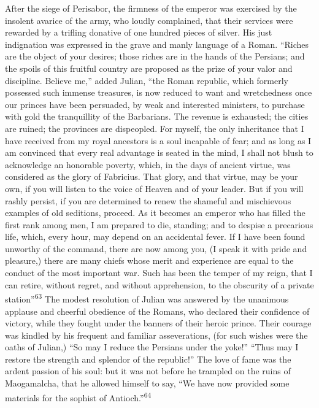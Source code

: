 After the siege of Perisabor, the firmness of the emperor was
exercised by the insolent avarice of the army, who loudly
complained, that their services were rewarded by a trifling
donative of one hundred pieces of silver. His just indignation
was expressed in the grave and manly language of a Roman. “Riches
are the object of your desires; those riches are in the hands of
the Persians; and the spoils of this fruitful country are
proposed as the prize of your valor and discipline. Believe me,”
added Julian, “the Roman republic, which formerly possessed such
immense treasures, is now reduced to want and wretchedness once
our princes have been persuaded, by weak and interested
ministers, to purchase with gold the tranquillity of the
Barbarians. The revenue is exhausted; the cities are ruined; the
provinces are dispeopled. For myself, the only inheritance that I
have received from my royal ancestors is a soul incapable of
fear; and as long as I am convinced that every real advantage is
seated in the mind, I shall not blush to acknowledge an honorable
poverty, which, in the days of ancient virtue, was considered as
the glory of Fabricius. That glory, and that virtue, may be your
own, if you will listen to the voice of Heaven and of your
leader. But if you will rashly persist, if you are determined to
renew the shameful and mischievous examples of old seditions,
proceed. As it becomes an emperor who has filled the first rank
among men, I am prepared to die, standing; and to despise a
precarious life, which, every hour, may depend on an accidental
fever. If I have been found unworthy of the command, there are
now among you, (I speak it with pride and pleasure,) there are
many chiefs whose merit and experience are equal to the conduct
of the most important war. Such has been the temper of my reign,
that I can retire, without regret, and without apprehension, to
the obscurity of a private station”\textsuperscript{63} The modest resolution of
Julian was answered by the unanimous applause and cheerful
obedience of the Romans, who declared their confidence of
victory, while they fought under the banners of their heroic
prince. Their courage was kindled by his frequent and familiar
asseverations, (for such wishes were the oaths of Julian,) “So
may I reduce the Persians under the yoke!” “Thus may I restore
the strength and splendor of the republic!” The love of fame was
the ardent passion of his soul: but it was not before he trampled
on the ruins of Maogamalcha, that he allowed himself to say, “We
have now provided some materials for the sophist of Antioch.”\textsuperscript{64}

